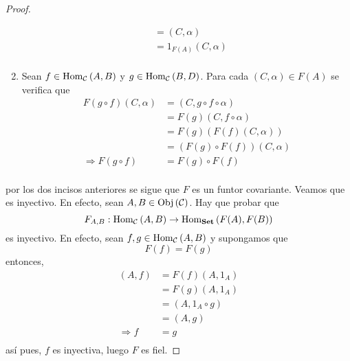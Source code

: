 \documentclass[12pt]{report}
\theoremstyle{largebreak}
\newcommand{\Obj}[1]{\ensuremath{\textup{Obj}\left(#1\right)}}
\newcommand{\Hom}[3]{\ensuremath{\textup{Hom}_{#1}\left(#2,#3\right)}}
\newcommand{\Cat}[1]{\ensuremath{\textup{\textbf{#1}}}}
\begin{document}
\begin{proof}
\begin{enumerate}
\begin{equation*}
\begin{split}
                    &=(C,\alpha)\\
                    &=1_{ F(A)}(C,\alpha)\\
                \end{split}
            \end{equation*}
            \item Sean $f\in\Hom{\mathcal{C}}{A}{B}$ y $g\in\Hom{\mathcal{C}}{B}{D}$. Para cada $(C,\alpha)\in F(A)$ se verifica que
            \begin{equation*}
                \begin{split}
                    F(g\circ f)(C,\alpha)&=(C,g\circ f\circ \alpha)\\
                    &=F(g)(C,f\circ\alpha)\\
                    &=F(g)(F(f)(C,\alpha))\\
                    &=(F(g)\circ F(f))(C,\alpha)\\
                    \Rightarrow F(g\circ f)&=F(g)\circ F(f)\\
                \end{split}
            \end{equation*}
        \end{enumerate}
        por los dos incisos anteriores se sigue que $F$ es un funtor covariante.
        Veamos que es inyectivo. En efecto, sean $A,B\in\Obj{\mathcal{C}}$. Hay que probar que
        \begin{equation*}
            F_{A,B}:\Hom{\mathcal{C}}{A}{B}\rightarrow\Hom{\Cat{Set}}{F(A)}{F(B)}
        \end{equation*}
        es inyectivo. En efecto, sean $f,g\in\Hom{\mathcal{C}}{A}{B}$ y supongamos que
        \begin{equation*}
            F(f)=F(g)
        \end{equation*}
        entonces,
        \begin{equation*}
            \begin{split}
                (A,f)&=F(f)(A,1_A)\\
                &=F(g)(A,1_A)\\
                &=(A,1_A\circ g)\\
                &=(A,g)\\
                \Rightarrow f&=g\\
            \end{split}
        \end{equation*}
        así pues, $f$ es inyectiva, luego $F$ es fiel.
    \end{proof}
\end{document}
